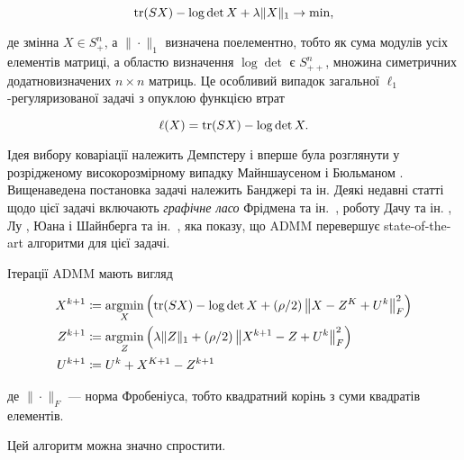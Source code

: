 \begin{equation}
    \operatorname{tr} (S X) - \log \det X + \lambda \|X\|_1 \to \min,
\end{equation}

де змінна $X \in S_+^n$, а $\|\cdot\|_1$ визначена поелементно, тобто як сума модулів усіх елементів матриці, а областю визначення $\log \det$ є $S_{++}^n$, множина симетричних додатновизначених $n\times n$ матриць. Це особливий випадок загальної $\ell_1$-регуляризованої задачі з опуклою функцією втрат

\begin{equation}
    \ell(X) = \operatorname{tr} (S X) - \log \det X.
\end{equation}

Ідея вибору коваріації належить Демпстеру \cite{48} і вперше була розглянути у розрідженому високорозмірному випадку Майншаусеном і Бюльманом \cite{123}. Вищенаведена постановка задачі належить Банджері та ін. \cite{7} Деякі недавні статті щодо цієї задачі включають \textit{графічне ласо} Фрідмена та ін.~\cite{79}, роботу Дачу та ін. \cite{55}, Лу \cite{115}, Юана \cite{178} і Шайнберга та ін.~\cite{148}, яка показу, що ADMM перевершує state-of-the-art алгоритми для цієї задачі. \medskip

Ітерації ADMM мають вигляд

\begin{align}
    X^{k + 1} &\coloneqq \operatorname*{argmin}_X \left( \operatorname{tr} (SX) - \log \det X + (\rho / 2) \left\|X - Z^K + U^k \right\|_F^2\right) \\
    Z^{k + 1} &\coloneqq \operatorname*{argmin}_Z \left( \lambda\|Z\|_1 + (\rho/2)\left\|X^{k + 1} - Z + U^k\right\|_F^2\right) \\
    U^{k + 1} &\coloneqq U^k + X^{K + 1} - Z^{k + 1}
\end{align}

де $\|\cdot\|_F$ --- норма Фробеніуса, тобто квадратний корінь з суми квадратів елементів.

\begin{proposition}
    Цей алгоритм можна значно спростити.
\end{proposition}

